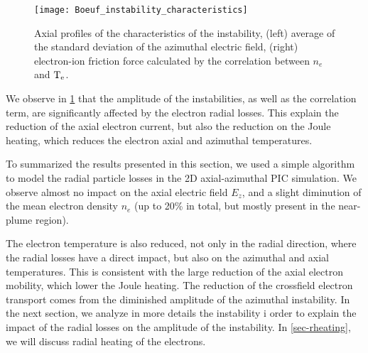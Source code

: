     \begin{figure}[!hbt]
      \centering
      \texttt{[image: Boeuf\_instability\_characteristics]}
      \caption{Axial profiles of the characteristics of the instability, (left) average of the standard deviation of the azimuthal electric field, (right) electron-ion friction force calculated by the correlation between $n_e$ and $\mathrm{T_e}$.    }
      \label{fig-boeuf-instability}
    \end{figure}

    
    We observe in \cref{fig-boeuf-instability} that the amplitude of the instabilities, as well as the correlation term, are significantly affected by the electron radial losses.
    This explain the reduction of the axial electron current, but also the reduction on the Joule heating, which reduces the electron axial and azimuthal temperatures.

    \vspace{1em}
    To summarized the results presented in this section, we used a simple algorithm to model the radial particle losses in the \ac{2D} axial-azimuthal \ac{PIC} simulation.
    We observe almost no impact on the axial electric field $E_z$, and a slight diminution of the mean electron density $n_e$ (up to 20\% in total, but mostly present in the near-plume region).
    
    The electron temperature is also reduced, not only in the radial direction, where the radial losses have a direct impact, but also on the azimuthal and axial temperatures.
    This is consistent with the large reduction of the axial electron mobility, which lower the Joule heating.
    The reduction of the crossfield electron transport comes from the diminished amplitude of the azimuthal instability.
    In the next section, we analyze in more details the instability i order to explain the impact of the radial losses on the amplitude of the instability.
    In \cref{sec-rheating}, we will discuss radial heating of the electrons.


\afterpage{\clearpage}
